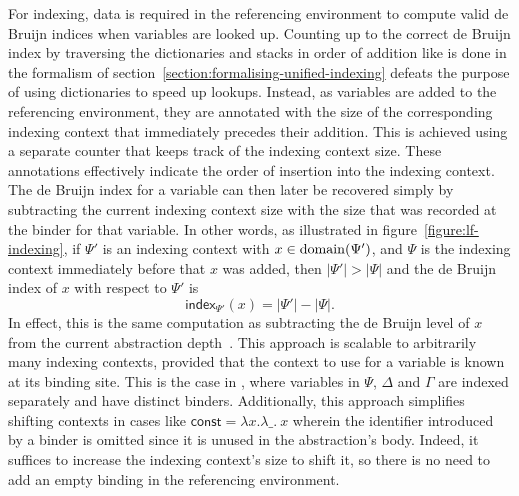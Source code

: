 For indexing, data is required in the referencing environment to compute valid de Bruijn indices when variables are looked up.
Counting up to the correct de Bruijn index by traversing the dictionaries and stacks in order of addition like is done in the formalism of section~\ref{section:formalising-unified-indexing} defeats the purpose of using dictionaries to speed up lookups.
Instead, as variables are added to the referencing environment, they are annotated with the size of the corresponding indexing context that immediately precedes their addition.
This is achieved using a separate counter that keeps track of the indexing context size.
These annotations effectively indicate the order of insertion into the indexing context.
The de Bruijn index for a variable can then later be recovered simply by subtracting the current indexing context size with the size that was recorded at the binder for that variable.
In other words, as illustrated in figure~\ref{figure:lf-indexing}, if $\Psi'$ is an indexing context with $x \in \operatorname{domain}(\Psi')$, and $\Psi$ is the indexing context immediately before that $x$ was added, then $|\Psi'| > |\Psi|$ and the de Bruijn index of $x$ with respect to $\Psi'$ is
\begin{equation*}
\mathsf{index}_{\Psi'}(x) = |\Psi'| - |\Psi|.
\end{equation*}
In effect, this is the same computation as subtracting the de Bruijn level of $x$ from the current abstraction depth~\cite{DEBRUIJN1972381, debruijnlevels1995}.
This approach is scalable to arbitrarily many indexing contexts, provided that the context to use for a variable is known at its binding site.
This is the case in \Beluga, where variables in $\Psi$, $\Delta$ and $\Gamma$ are indexed separately and have distinct binders.
Additionally, this approach simplifies shifting contexts in cases like $\mathsf{const} = \lambda x.\lambda\_.\ x$ wherein the identifier introduced by a binder is omitted since it is unused in the abstraction's body.
Indeed, it suffices to increase the indexing context's size to shift it, so there is no need to add an empty binding in the referencing environment.

